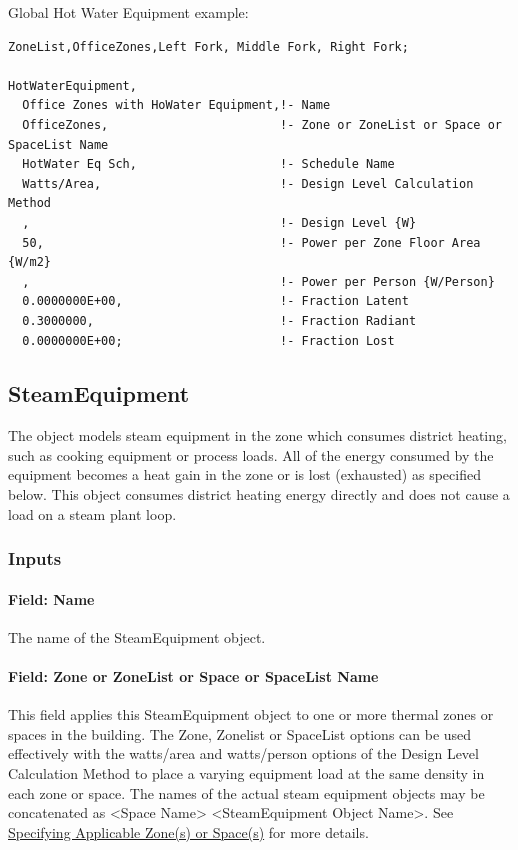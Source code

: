 Global Hot Water Equipment example:

\begin{lstlisting}
ZoneList,OfficeZones,Left Fork, Middle Fork, Right Fork;

HotWaterEquipment,
  Office Zones with HoWater Equipment,!- Name
  OfficeZones,                        !- Zone or ZoneList or Space or SpaceList Name
  HotWater Eq Sch,                    !- Schedule Name
  Watts/Area,                         !- Design Level Calculation Method
  ,                                   !- Design Level {W}
  50,                                 !- Power per Zone Floor Area {W/m2}
  ,                                   !- Power per Person {W/Person}
  0.0000000E+00,                      !- Fraction Latent
  0.3000000,                          !- Fraction Radiant
  0.0000000E+00;                      !- Fraction Lost
\end{lstlisting}

\subsection{SteamEquipment}\label{steamequipment}

The object models steam equipment in the zone which consumes district heating, such as cooking equipment or process loads. All of the energy consumed by the equipment becomes a heat gain in the zone or is lost (exhausted) as specified below. This object consumes district heating energy directly and does not cause a load on a steam plant loop.

\subsubsection{Inputs}\label{inputs-6-012}

\paragraph{Field: Name}\label{field-name-6-009}

The name of the SteamEquipment object.

\paragraph{Field: Zone or ZoneList or Space or SpaceList Name}\label{steameq-field-zone-or-zonelist-name-000}

This field applies this SteamEquipment object to one or more thermal zones or spaces in the building. The Zone, Zonelist or SpaceList options can be used effectively with the watts/area and watts/person options of the Design Level Calculation Method to place a varying equipment load at the same density in each zone or space. The names of the actual steam equipment objects may be concatenated as \textless{}Space Name\textgreater{} \textless{}SteamEquipment Object Name\textgreater{}. See \hyperref[specifying-applicable-zones-or-spaces]{Specifying Applicable Zone(s) or Space(s)} for more details.

